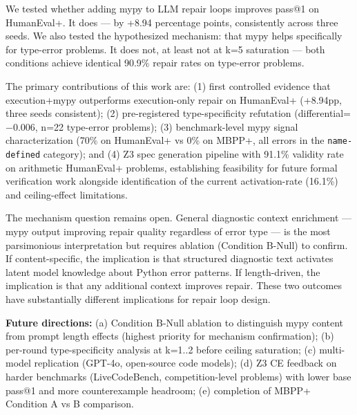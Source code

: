 
We tested whether adding mypy to LLM repair loops improves pass@1 on HumanEval+. It does --- by +8.94 percentage points, consistently across three seeds. We also tested the hypothesized mechanism: that mypy helps specifically for type-error problems. It does not, at least not at k=5 saturation --- both conditions achieve identical 90.9\% repair rates on type-error problems.

The primary contributions of this work are: (1) first controlled evidence that execution+mypy outperforms execution-only repair on HumanEval+ (+8.94pp, three seeds consistent); (2) pre-registered type-specificity refutation (differential=$-0.006$, n=22 type-error problems); (3) benchmark-level mypy signal characterization (70\% on HumanEval+ vs 0\% on MBPP+, all errors in the \texttt{name-defined} category); and (4) Z3 spec generation pipeline with 91.1\% validity rate on arithmetic HumanEval+ problems, establishing feasibility for future formal verification work alongside identification of the current activation-rate (16.1\%) and ceiling-effect limitations.

The mechanism question remains open. General diagnostic context enrichment --- mypy output improving repair quality regardless of error type --- is the most parsimonious interpretation but requires ablation (Condition B-Null) to confirm. If content-specific, the implication is that structured diagnostic text activates latent model knowledge about Python error patterns. If length-driven, the implication is that any additional context improves repair. These two outcomes have substantially different implications for repair loop design.

\textbf{Future directions:} (a) Condition B-Null ablation to distinguish mypy content from prompt length effects (highest priority for mechanism confirmation); (b) per-round type-specificity analysis at k=1..2 before ceiling saturation; (c) multi-model replication (GPT-4o, open-source code models); (d) Z3 CE feedback on harder benchmarks (LiveCodeBench, competition-level problems) with lower base pass@1 and more counterexample headroom; (e) completion of MBPP+ Condition A vs B comparison.

